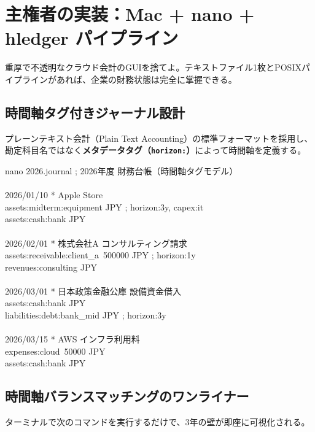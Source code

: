 \ifja
\chapter{主権者の実装：Mac + nano + hledger パイプライン}
\label{chap:hledger_implementation}

重厚で不透明なクラウド会計のGUIを捨てよ。テキストファイル1枚とPOSIXパイプラインがあれば、企業の財務状態は完全に掌握できる。

\section{時間軸タグ付きジャーナル設計}
プレーンテキスト会計（Plain Text Accounting）の標準フォーマットを採用し、勘定科目名ではなく\textbf{メタデータタグ（\texttt{horizon:}）}によって時間軸を定義する。

\begin{terminalbox}{nano 2026.journal}
; 2026年度 財務台帳（時間軸タグモデル）\\
\\
2026/01/10 * Apple Store\\
\quad assets:midterm:equipment JPY \quad ; horizon:3y, capex:it\\
\quad assets:cash:bank\qquad\qquad{} JPY\\
\\
2026/02/01 * 株式会社A コンサルティング請求\\
\quad assets:receivable:client\_a\quad\ 500000 JPY \quad ; horizon:1y\\
\quad revenues:consulting\qquad{} JPY\\
\\
2026/03/01 * 日本政策金融公庫 設備資金借入\\
\quad assets:cash:bank\qquad\qquad{} JPY\\
\quad liabilities:debt:bank\_mid JPY \quad ; horizon:3y\\
\\
2026/03/15 * AWS インフラ利用料\\
\quad expenses:cloud\qquad\qquad\quad\ 50000 JPY\\
\quad assets:cash:bank\qquad\qquad{} JPY
\end{terminalbox}

\section{時間軸バランスマッチングのワンライナー}
ターミナルで次のコマンドを実行するだけで、3年の壁が即座に可視化される。

